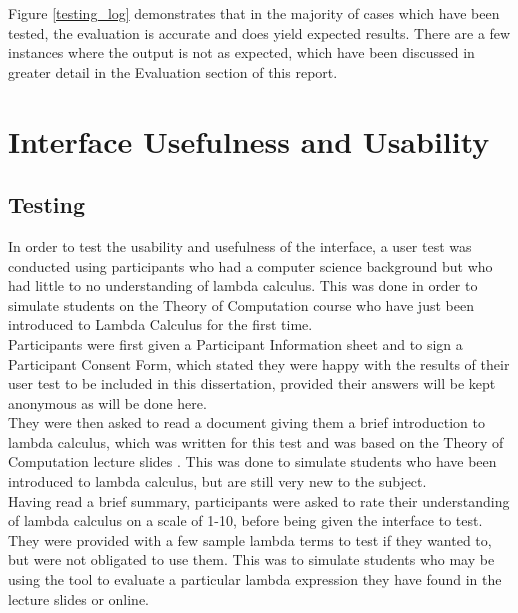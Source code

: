 \documentclass[a4paper,12pt]{report}
\begin{document}
\newpage

Figure \ref{testing_log} demonstrates that in the majority of cases which have been tested, the evaluation is accurate and does yield expected results. There are a few instances where the output is not as expected, which have been discussed in greater detail in the Evaluation section of this report.

\section{Interface Usefulness and Usability}
\label{interface usefulness and usability}
\subsection{Testing}

In order to test the usability and usefulness of the interface, a user test was conducted using participants who had a computer science background but who had little to no understanding of lambda calculus. This was done in order to simulate students on the Theory of Computation course who have just been introduced to Lambda Calculus for the first time.\\

Participants were first given a Participant Information sheet and to sign a Participant Consent Form, which stated they were happy with the results of their user test to be included in this dissertation, provided their answers will be kept anonymous as will be done here.\\

They were then asked to read a document giving them a brief introduction to lambda calculus, which was written for this test and was based on the Theory of Computation lecture slides \cite{Gay2019}. This was done to simulate students who have been introduced to lambda calculus, but are still very new to the subject.\\

Having read a brief summary, participants were asked to rate their understanding of lambda calculus on a scale of 1-10, before being given the interface to test. They were provided with a few sample lambda terms to test if they wanted to, but were not obligated to use them. This was to simulate students who may be using the tool to evaluate a particular lambda expression they have found in the lecture slides or online.\\
\end{document}

